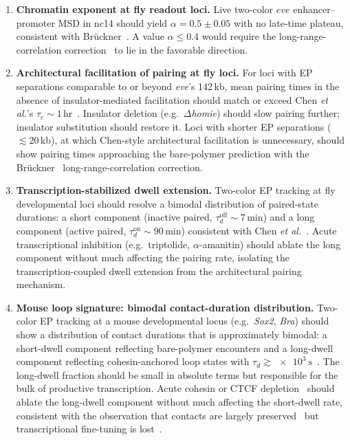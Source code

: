 \documentclass[11pt]{article}
\begin{document}
\begin{enumerate}
  \item \textbf{Chromatin exponent at fly readout loci.} Live two-color
        $eve$ enhancer--promoter MSD in nc14 should yield
        $\alpha = 0.5\pm 0.05$ with no late-time plateau, consistent with
        Br\"uckner~\cite{Bruckner2023}. A value $\alpha\le 0.4$ would require
        the long-range-correlation correction~\cite{Bruckner2023} to lie in
        the favorable direction.

  \item \textbf{Architectural facilitation of pairing at fly loci.} For
        loci with EP separations comparable to or beyond \textit{eve}'s
        142\,kb, mean pairing times in the absence of insulator-mediated
        facilitation should match or exceed Chen \textit{et al.}'s
        $\tau_c\!\sim\!1$\,hr~\cite{Chen2018}. Insulator deletion (e.g.\
        $\Delta$\textit{homie}) should slow pairing further; insulator
        substitution should restore it. Loci with shorter EP separations
        ($\lesssim\!20$\,kb), at which Chen-style architectural
        facilitation is unnecessary, should show pairing times
        approaching the bare-polymer prediction with the
        Br\"uckner~\cite{Bruckner2023} long-range-correlation correction.

  \item \textbf{Transcription-stabilized dwell extension.} Two-color EP
        tracking at fly developmental loci should resolve a bimodal
        distribution of paired-state durations: a short component
        (inactive paired, $\tau_d^{\mathrm{off}}\!\sim\!7$\,min) and a
        long component (active paired, $\tau_d^{\mathrm{on}}\!\sim\!90$\,min)
        consistent with Chen \textit{et al.}~\cite{Chen2018}. Acute
        transcriptional inhibition (e.g.\ triptolide, $\alpha$-amanitin)
        should ablate the long component without much affecting the
        pairing rate, isolating the transcription-coupled dwell extension
        from the architectural pairing mechanism.

  \item \textbf{Mouse loop signature: bimodal contact-duration
        distribution.} Two-color EP tracking at a mouse developmental
        locus (e.g.\ \textit{Sox2}, \textit{Bra}) should show a
        distribution of contact durations that is approximately bimodal:
        a short-dwell component reflecting bare-polymer encounters and a
        long-dwell component reflecting cohesin-anchored loop states with
        $\tau_d \gtrsim \SI{e3}{\second}$~\cite{Gabriele2022}. The
        long-dwell fraction should be small in absolute terms but
        responsible for the bulk of productive transcription. Acute
        cohesin or CTCF depletion~\cite{Saiz2026} should ablate the
        long-dwell component without much affecting the short-dwell rate,
        consistent with the observation that contacts are largely
        preserved~\cite{Hsieh2022} but transcriptional fine-tuning is
        lost~\cite{Saiz2026}.


\end{enumerate}
\end{document}
